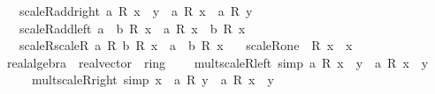 \begin{isabellebody}
\ \ \ scaleR{\isacharunderscore}{\kern0pt}add{\isacharunderscore}{\kern0pt}right{\isacharcolon}{\kern0pt}\ {\isachardoublequoteopen}a\ {\isacharasterisk}{\kern0pt}\isactrlsub R\ {\isacharparenleft}{\kern0pt}x\ {\isacharplus}{\kern0pt}\ y{\isacharparenright}{\kern0pt}\ {\isacharequal}{\kern0pt}\ a\ {\isacharasterisk}{\kern0pt}\isactrlsub R\ x\ {\isacharplus}{\kern0pt}\ a\ {\isacharasterisk}{\kern0pt}\isactrlsub R\ y{\isachardoublequoteclose}\isanewline
\ \ \ scaleR{\isacharunderscore}{\kern0pt}add{\isacharunderscore}{\kern0pt}left{\isacharcolon}{\kern0pt}\ {\isachardoublequoteopen}{\isacharparenleft}{\kern0pt}a\ {\isacharplus}{\kern0pt}\ b{\isacharparenright}{\kern0pt}\ {\isacharasterisk}{\kern0pt}\isactrlsub R\ x\ {\isacharequal}{\kern0pt}\ a\ {\isacharasterisk}{\kern0pt}\isactrlsub R\ x\ {\isacharplus}{\kern0pt}\ b\ {\isacharasterisk}{\kern0pt}\isactrlsub R\ x{\isachardoublequoteclose}\isanewline
\ \ \ scaleR{\isacharunderscore}{\kern0pt}scaleR{\isacharcolon}{\kern0pt}\ {\isachardoublequoteopen}a\ {\isacharasterisk}{\kern0pt}\isactrlsub R\ b\ {\isacharasterisk}{\kern0pt}\isactrlsub R\ x\ {\isacharequal}{\kern0pt}\ {\isacharparenleft}{\kern0pt}a\ {\isacharasterisk}{\kern0pt}\ b{\isacharparenright}{\kern0pt}\ {\isacharasterisk}{\kern0pt}\isactrlsub R\ x{\isachardoublequoteclose}\isanewline
\ \ \ scaleR{\isacharunderscore}{\kern0pt}one{\isacharcolon}{\kern0pt}\ {\isachardoublequoteopen}{}\ {\isacharasterisk}{\kern0pt}\isactrlsub R\ x\ {\isacharequal}{\kern0pt}\ x{\isachardoublequoteclose}\isanewline
\isanewline
{}\isamarkupfalse%
\ real{\isacharunderscore}{\kern0pt}algebra\ {\isacharequal}{\kern0pt}\ real{\isacharunderscore}{\kern0pt}vector\ {\isacharplus}{\kern0pt}\ ring\ {\isacharplus}{\kern0pt}\isanewline
\ \ \ mult{\isacharunderscore}{\kern0pt}scaleR{\isacharunderscore}{\kern0pt}left\ {\isacharbrackleft}{\kern0pt}simp{\isacharbrackright}{\kern0pt}{\isacharcolon}{\kern0pt}\ {\isachardoublequoteopen}a\ {\isacharasterisk}{\kern0pt}\isactrlsub R\ x\ {\isacharasterisk}{\kern0pt}\ y\ {\isacharequal}{\kern0pt}\ a\ {\isacharasterisk}{\kern0pt}\isactrlsub R\ {\isacharparenleft}{\kern0pt}x\ {\isacharasterisk}{\kern0pt}\ y{\isacharparenright}{\kern0pt}{\isachardoublequoteclose}\isanewline
\ \ \ \ \ mult{\isacharunderscore}{\kern0pt}scaleR{\isacharunderscore}{\kern0pt}right\ {\isacharbrackleft}{\kern0pt}simp{\isacharbrackright}{\kern0pt}{\isacharcolon}{\kern0pt}\ {\isachardoublequoteopen}x\ {\isacharasterisk}{\kern0pt}\ a\ {\isacharasterisk}{\kern0pt}\isactrlsub R\ y\ {\isacharequal}{\kern0pt}\ a\ {\isacharasterisk}{\kern0pt}\isactrlsub R\ {\isacharparenleft}{\kern0pt}x\ {\isacharasterisk}{\kern0pt}\ y{\isacharparenright}{\kern0pt}{\isachardoublequoteclose}\isanewline

\end{isabellebody}
